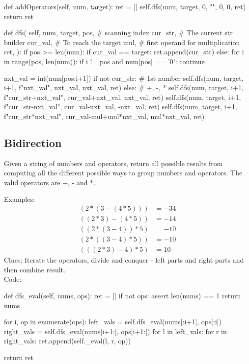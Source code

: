 \begin{python}
def addOperators(self, num, target):
  ret = []
  self.dfs(num, target, 0, "", 0, 0, ret)
  return ret

def dfs(
    self, 
    num, 
    target, 
    pos,  # scanning index 
    cur_str,  # The current str builder 
    cur_val,  # To reach the target 
    mul,  # first operand for multiplication 
    ret,
):
  if pos >= len(num):
    if cur_val == target:
      ret.append(cur_str)
  else:
    for i in range(pos, len(num)):
      if i != pos and num[pos] == '0':
        continue
        
      nxt_val = int(num[pos:i+1])
      if not cur_str:  # 1st number
        self.dfs(num, target, i+1, 
            f"nxt_val", nxt_val,
            nxt_val, ret)
      else:  # +, -, *
        self.dfs(num, target, i+1, 
            f"{cur_str}+{nxt_val}", cur_val+nxt_val, 
            nxt_val, ret)
        self.dfs(num, target, i+1, 
            f"{cur_str}-{nxt_val}", cur_val-nxt_val, 
            -nxt_val, ret)
        self.dfs(num, target, i+1, 
    f"{cur_str}*{nxt_val}", cur_val-mul+mul*nxt_val, 
            mul*nxt_val, ret)
\end{python}
\subsection{Bidirection}
 Given a string of numbers and operators, return all possible
results from computing all the different possible ways to group numbers and operators.
The valid operators are +, - and *.

Examples:
\begin{align*}
(2*(3-(4*5))) &= -34 \\
((2*3)-(4*5)) &= -14 \\
((2*(3-4))*5) &= -10 \\
(2*((3-4)*5)) &= -10 \\
(((2*3)-4)*5) &= 10
\end{align*}
Clues: Iterate the operators, divide and conquer - left parts and right parts and then
combine result. \\
Code:
\begin{python}
def dfs_eval(self, nums, ops):
  ret = []
  if not ops:
    assert len(nums) == 1
    return nums

  for i, op in enumerate(ops):
    left_vals = self.dfs_eval(nums[:i+1], ops[:i])
    right_vals = self.dfs_eval(nums[i+1:], ops[i+1:])
    for l in left_vals:
      for r in right_vals:
        ret.append(self._eval(l, r, op))

  return ret
\end{python}
